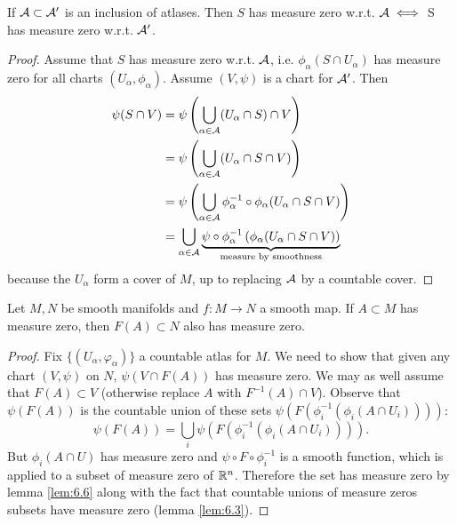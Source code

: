 \begin{lemma}\label{lem:6.7}
    If \(\mathcal{A}\subset\mathcal{A}'\) is an inclusion of atlases. Then \(S\) has measure zero w.r.t. \(\mathcal{A}\iff\) S has measure zero w.r.t. \(\mathcal{A}'\).
\end{lemma}

\begin{proof}%
    Assume that \(S\) has measure zero w.r.t. \(\mathcal{A}\), i.e. \(\phi_\alpha(S\cap U_\alpha)\) has measure zero for all charts 
    \((U_\alpha,\phi_\alpha)\). Assume \((V,\psi)\) is a chart for \(\mathcal{A}'\). Then 
    \begin{align*}
        \psi(S\cap V)&=\psi\left(\bigcup_{\alpha\in\mathcal{A}} (U_\alpha\cap S)\cap V\right)\\
                     &=\psi\left(\bigcup_{\alpha\in\mathcal{A}} (U_\alpha\cap S\cap V)\right)\\
                     &=\psi\left(\bigcup_{\alpha\in\mathcal{A}} \phi_\alpha^{-1}\circ \phi_\alpha (U_\alpha\cap S\cap V)\right)\\
                     &=\bigcup_{\alpha\in\mathcal{A}} \underbrace{\psi\circ\phi_\alpha^{-1}\left( \phi_\alpha (U_\alpha\cap S\cap V)\right)}_{\text{measure by smoothness}}
    \end{align*}
    because the \(U_\alpha\) form a cover of \(M\), up to replacing \(\mathcal{A}\) by a countable cover.
\end{proof}


\begin{lemma}\label{6.8}
    Let \(M,N\) be smooth manifolds and \(f:M\to N\) a smooth map. If \(A\subset M\)
    has measure zero, then \(F(A)\subset N\) also has measure zero.
\end{lemma}

\begin{proof}
    Fix \(\{(U_\alpha,\varphi_\alpha)\}\) a countable atlas for \(M\). We need to show 
    that given any chart \((V,\psi)\) on \(N\), \(\psi(V\cap F(A))\) has measure zero.
    We may as well assume that \(F(A)\subset V\) (otherwise replace \(A\) with \(F^{-1}(A)\cap V\)).
    Observe that \(\psi(F(A))\) is the countable union of these sets \(\psi(F(\phi_i^{-1}(\phi_i(A\cap U_i))))\):
    \[\psi(F(A))=\bigcup_{i}\psi(F(\phi_i^{-1}(\phi_i(A\cap U_i)))).\]
    But \(\phi_i(A\cap U)\) has measure zero and \(\psi\circ F\circ \phi_i^{-1}\) is a smooth function, which is applied 
    to a subset of measure zero of \(\mathbb{R}^n\). Therefore the set has measure zero by lemma \ref{lem:6.6} along with 
    the fact that countable unions of measure zeros subsets have measure zero (lemma \ref{lem:6.3}).
\end{proof}
